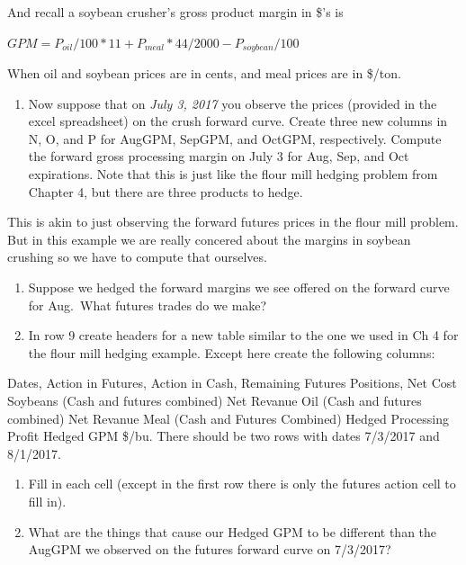 \documentclass[
]{book}
\providecommand{\tightlist}{%
  \setlength{\itemsep}{0pt}\setlength{\parskip}{0pt}}
\begin{document}
And recall a soybean crusher's gross product margin in \$'s is

\(GPM = P_{oil}/100*11 + P_{meal}*44/2000 - P_{soybean}/100\)

When oil and soybean prices are in cents, and meal prices are in \$/ton.

\begin{enumerate}
\def\labelenumi{\arabic{enumi}.}
\tightlist
\item
  Now suppose that on \emph{July 3, 2017} you observe the prices (provided in the excel spreadsheet) on the crush forward curve. Create three new columns in N, O, and P for AugGPM, SepGPM, and OctGPM, respectively. Compute the forward gross processing margin on July 3 for Aug, Sep, and Oct expirations. Note that this is just like the flour mill hedging problem from Chapter 4, but there are three products to hedge.
\end{enumerate}

This is akin to just observing the forward futures prices in the flour mill problem. But in this example we are really concered about the margins in soybean crushing so we have to compute that ourselves.

\begin{enumerate}
\def\labelenumi{\arabic{enumi}.}
\setcounter{enumi}{1}
\item
  Suppose we hedged the forward margins we see offered on the forward curve for Aug.~What futures trades do we make?
\item
  In row 9 create headers for a new table similar to the one we used in Ch 4 for the flour mill hedging example. Except here create the following columns:
\end{enumerate}

Dates, Action in Futures, Action in Cash, Remaining Futures Positions, Net Cost Soybeans (Cash and futures combined) Net Revanue Oil (Cash and futures combined) Net Revanue Meal (Cash and Futures Combined) Hedged Processing Profit Hedged GPM \$/bu. There should be two rows with dates 7/3/2017 and 8/1/2017.

\begin{enumerate}
\def\labelenumi{\arabic{enumi}.}
\setcounter{enumi}{3}
\item
  Fill in each cell (except in the first row there is only the futures action cell to fill in).
\item
  What are the things that cause our Hedged GPM to be different than the AugGPM we observed on the futures forward curve on 7/3/2017?
\end{enumerate}
\end{document}
